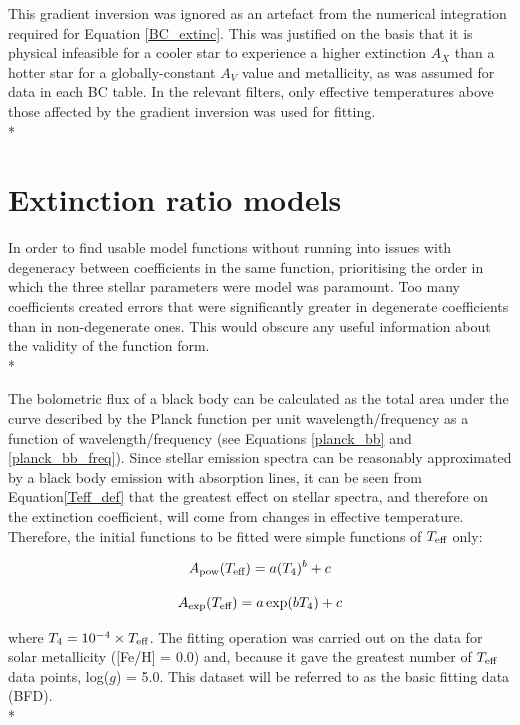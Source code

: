 \documentclass[12pt, a4paper]{report}
\begin{document}
This gradient inversion was ignored as an artefact from the numerical integration required for Equation \ref{BC_extinc}. This was justified on the basis that it is physical infeasible for a cooler star to experience a higher extinction $A_{X}$ than a hotter star for a globally-constant $A_{V}$ value and metallicity, as was assumed for data in each BC table. In the relevant filters, only effective temperatures above those affected by the gradient inversion was used for fitting.\\*

\section{Extinction ratio models} \label{ext_models}

In order to find usable model functions without running into issues with degeneracy between coefficients in the same function, prioritising the order in which the three stellar parameters were model was paramount. Too many coefficients created errors that were significantly greater in degenerate coefficients than in non-degenerate ones. This would obscure any useful information about the validity of the function form.\\*

The bolometric flux of a black body can be calculated as the total area under the curve described by the Planck function per unit wavelength/frequency as a function of wavelength/frequency  (see Equations \ref{planck_bb} and \ref{planck_bb_freq}). Since stellar emission spectra can be reasonably approximated by a black body emission with absorption lines, it can be seen from Equation\ref{Teff_def} that the greatest effect on stellar spectra, and therefore on the extinction coefficient, will come from changes in effective temperature. Therefore, the initial functions to be fitted were simple functions of $T_{\textnormal{eff}}$ only:

\begin{equation}
A_{\textnormal{pow}} (T_{\textnormal{eff}}) = a (T_{4})^{b} + c
\label{Teff_pow}
\end{equation}

\begin{equation}
A_{\textnormal{exp}} (T_{\textnormal{eff}}) = a \exp(b T_{4}) + c
\label{Teff_exp}
\end{equation}

where $T_{4} = 10^{-4} \times T_{\textnormal{eff}}$. The fitting operation was carried out on the data for solar metallicity ([Fe/H] = 0.0) and, because it gave the greatest number of $T_{\textnormal{eff}}$ data points, log($g$) = 5.0. This dataset will be referred to as the basic fitting data (BFD).\\*
\end{document}
